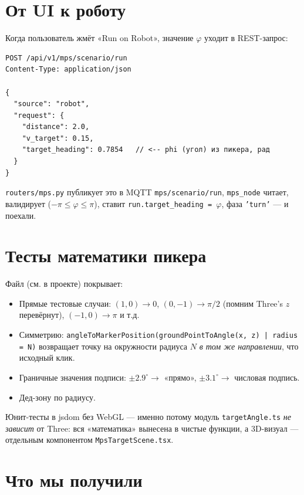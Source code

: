 \section{От UI к роботу}

Когда пользователь жмёт «Run on Robot», значение $\varphi$ уходит в
REST-запрос:

\begin{codebox}[title={REST}]
\begin{verbatim}
POST /api/v1/mps/scenario/run
Content-Type: application/json

{
  "source": "robot",
  "request": {
    "distance": 2.0,
    "v_target": 0.15,
    "target_heading": 0.7854   // <-- phi (угол) из пикера, рад
  }
}
\end{verbatim}
\end{codebox}

\texttt{routers/mps.py} публикует это в MQTT \texttt{mps/scenario/run},
\texttt{mps\_node} читает, валидирует ($-\pi \le \varphi \le \pi$),
ставит \texttt{run.target\_heading = $\varphi$}, фаза \texttt{'turn'}
--- и поехали.

\section{Тесты математики пикера}

Файл 
(см. в проекте) покрывает:

\begin{itemize}
  \item Прямые тестовые случаи: $(1, 0) \to 0$, $(0, -1) \to \pi/2$ (помним
        Three's $z$ перевёрнут), $(-1, 0) \to \pi$ и т.д.
  \item Симметрию: \texttt{angleToMarkerPosition(groundPointToAngle(x, z) | radius = N)}
        возвращает точку на окружности радиуса $N$ \emph{в том же
        направлении}, что исходный клик.
  \item Граничные значения подписи: $\pm 2.9^\circ \to$ «прямо»,
        $\pm 3.1^\circ \to$ числовая подпись.
  \item Дед-зону по радиусу.
\end{itemize}

Юнит-тесты в jsdom без WebGL --- именно потому модуль \texttt{targetAngle.ts}
\emph{не зависит} от Three: вся «математика» вынесена в чистые функции,
а 3D-визуал --- отдельным компонентом \texttt{MpsTargetScene.tsx}.

\section{Что мы получили}

